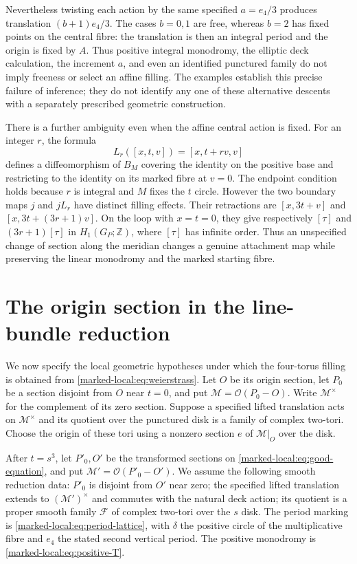 Nevertheless twisting each action by the same specified $a=e_4/3$
produces translation $(b+1)e_4/3$. The cases $b=0,1$ are free,
whereas $b=2$ has fixed points on the central fibre: the translation
is then an integral period and the origin is fixed by $A$.
Thus positive integral monodromy, the elliptic deck calculation,
the increment $a$, and even an identified punctured family do not
imply freeness or select an affine filling. The examples establish
this precise failure of inference; they do not identify any one
of these alternative descents with a separately prescribed geometric
construction.

There is a further ambiguity even when the affine central action is
fixed. For an integer $r$, the formula
\[
 L_r([x,t,v])=[x,t+rv,v]
\]
defines a diffeomorphism of $B_M$ covering the identity on the
positive base and restricting to the identity on its marked fibre
at $v=0$. The endpoint condition holds because $r$ is integral
and $M$ fixes the $t$ circle. However the two boundary maps $j$
and $jL_r$ have distinct filling effects. Their retractions are
$[x,3t+v]$ and $[x,3t+(3r+1)v]$.
On the loop with $x=t=0$, they give respectively $[\tau]$ and
$(3r+1)[\tau]$ in $H_1(G_P;\mathbb Z)$, where $[\tau]$ has
infinite order. Thus an unspecified change of section along the
meridian changes a genuine attachment map while preserving the
linear monodromy and the marked starting fibre.


\section{The origin section in the line-bundle reduction}

We now specify the local geometric hypotheses under which the
four-torus filling is obtained from \eqref{marked-local:eq:weierstrass}.
Let $O$ be its origin section, let $P_0$ be a section disjoint
from $O$ near $t=0$, and put $\mathcal M=\mathcal O(P_0-O)$.
Write $\mathcal M^\times$ for the complement of its zero section.
Suppose a specified lifted translation acts on $\mathcal M^\times$
and its quotient over the punctured disk is a family of complex
two-tori. Choose the origin of these tori using a nonzero section
$e$ of $\mathcal M|_O$ over the disk.

After $t=s^3$, let $P'_0,O'$ be the transformed sections on
\eqref{marked-local:eq:good-equation}, and put
$\mathcal M'=\mathcal O(P'_0-O')$. We assume the following smooth
reduction data: $P'_0$ is disjoint from $O'$ near zero; the specified
lifted translation extends to $(\mathcal M')^\times$ and commutes
with the natural deck action; its quotient is a proper smooth
family $\mathcal F$ of complex two-tori over the $s$ disk. The
period marking is \eqref{marked-local:eq:period-lattice}, with $\delta$ the
positive circle of the multiplicative fibre and $e_4$ the stated
second vertical period. The positive monodromy is
\eqref{marked-local:eq:positive-T}.

